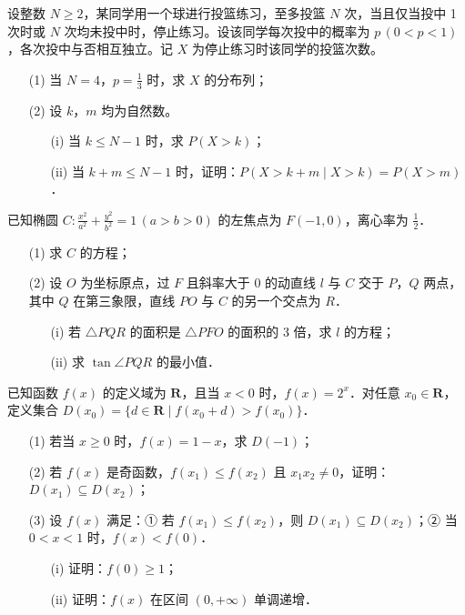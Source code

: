 \documentclass{exam-zh}
\begin{document}
\begin{problem}[points = 15]
  设整数 $N \geqslant 2$，某同学用一个球进行投篮练习，至多投篮 $N$ 次，当且仅当投中 1 次时或 $N$ 次均未投中时，停止练习。设该同学每次投中的概率为 $p \, (0 < p < 1)$，各次投中与否相互独立。记 $X$ 为停止练习时该同学的投篮次数。
  \begin{enumerate}
    \item[(1)] 当 $N = 4$，$p = \frac{1}{3}$ 时，求 $X$ 的分布列；
    \item[(2)] 设 $k$，$m$ 均为自然数。
    \begin{enumerate}
        \item[(i)] 当 $k \leqslant N - 1$ 时，求 $P(X > k)$；
        \item[(ii)] 当 $k + m \leqslant N - 1$ 时，证明：$P(X > k + m \mid X > k) = P(X > m)$．
    \end{enumerate}
  \end{enumerate}
\end{problem}

\begin{problem}[points = 17]
  已知椭圆 $C: \frac{x^2}{a^2} + \frac{y^2}{b^2} = 1 \, (a > b > 0)$ 的左焦点为 $F(-1, 0)$，离心率为 $\frac{1}{2}$．
  \begin{enumerate}
    \item[(1)] 求 $C$ 的方程；
    \item[(2)] 设 $O$ 为坐标原点，过 $F$ 且斜率大于 $0$ 的动直线 $l$ 与 $C$ 交于 $P$，$Q$ 两点，其中 $Q$ 在第三象限，直线 $P O$ 与 $C$ 的另一个交点为 $R$．
    \begin{enumerate}
        \item[(i)] 若 $\triangle P Q R$ 的面积是 $\triangle P F O$ 的面积的 3 倍，求 $l$ 的方程；
        \item[(ii)] 求 $\tan \angle P Q R$ 的最小值．
    \end{enumerate}
  \end{enumerate}
\end{problem}

\begin{problem}[points = 17]
  已知函数 $f(x)$ 的定义域为 $\mathbf{R}$，且当 $x < 0$ 时，$f(x) = 2^x$．对任意 $x_0 \in \mathbf{R}$，定义集合 $D(x_0) = \{d \in \mathbf{R} \mid f(x_0 + d) > f(x_0)\}$．
  \begin{enumerate}
    \item[(1)] 若当 $x \geqslant 0$ 时，$f(x) = 1 - x$，求 $D(-1)$；
    \item[(2)] 若 $f(x)$ 是奇函数，$f(x_1) \leqslant f(x_2)$ 且 $x_1 x_2 \ne 0$，证明：$D(x_1) \subseteq D(x_2)$；
    \item[(3)] 设 $f(x)$ 满足：① 若 $f(x_1) \leqslant f(x_2)$，则 $D(x_1) \subseteq D(x_2)$；② 当 $0 < x < 1$ 时，$f(x) < f(0)$．
    \begin{enumerate}
        \item[(i)] 证明：$f(0) \geqslant 1$；
        \item[(ii)] 证明：$f(x)$ 在区间 $(0, +\infty)$ 单调递增．
    \end{enumerate}
  \end{enumerate}
\end{problem}
\end{document}
